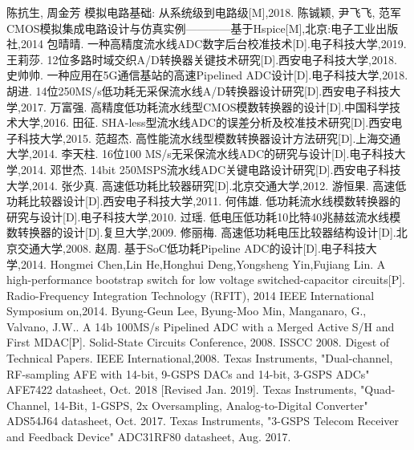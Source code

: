 \newpage

\begin{thebibliography}{99}
     陈抗生, 周金芳 模拟电路基础: 从系统级到电路级[M],2018.
      陈铖颖, 尹飞飞, 范军 CMOS模拟集成电路设计与仿真实例————基于Hspice[M],北京:电子工业出版社,2014
      包晴晴. 一种高精度流水线ADC数字后台校准技术[D].电子科技大学,2019.
      王莉莎. 12位多路时域交织A/D转换器关键技术研究[D].西安电子科技大学,2018.
      史帅帅. 一种应用在5G通信基站的高速Pipelined ADC设计[D].电子科技大学,2018.
      胡进. 14位250MS/s低功耗无采保流水线A/D转换器设计研究[D].西安电子科技大学,2017.
      万富强. 高精度低功耗流水线型CMOS模数转换器的设计[D].中国科学技术大学,2016.
      田征. SHA-less型流水线ADC的误差分析及校准技术研究[D].西安电子科技大学,2015.
      范超杰. 高性能流水线型模数转换器设计方法研究[D].上海交通大学,2014.
      李天柱. 16位100 MS/s无采保流水线ADC的研究与设计[D].电子科技大学,2014.
      邓世杰. 14bit 250MSPS流水线ADC关键电路设计研究[D].西安电子科技大学,2014.
      张少真. 高速低功耗比较器研究[D].北京交通大学,2012.
      游恒果. 高速低功耗比较器设计[D].西安电子科技大学,2011.
      何伟雄. 低功耗流水线模数转换器的研究与设计[D].电子科技大学,2010.
      过瑶. 低电压低功耗10比特40兆赫兹流水线模数转换器的设计[D].复旦大学,2009.
      修丽梅. 高速低功耗电压比较器结构设计[D].北京交通大学,2008.
      赵周. 基于SoC低功耗Pipeline ADC的设计[D].电子科技大学,2014.
      Hongmei Chen,Lin He,Honghui Deng,Yongsheng Yin,Fujiang Lin. A high-performance bootstrap switch for low voltage switched-capacitor circuits[P]. Radio-Frequency Integration Technology (RFIT), 2014 IEEE International Symposium on,2014.
      Byung-Geun Lee, Byung-Moo Min, Manganaro, G., Valvano, J.W.. A 14b 100MS/s Pipelined ADC with a Merged Active S/H and First MDAC[P]. Solid-State Circuits Conference, 2008. ISSCC 2008. Digest of Technical Papers. IEEE International,2008.
      Texas Instruments, "Dual-channel, RF-sampling AFE with 14-bit, 9-GSPS DACs and 14-bit, 3-GSPS ADCs" AFE7422 datasheet, Oct. 2018 [Revised Jan. 2019]. 
      Texas Instruments, "Quad-Channel, 14-Bit, 1-GSPS, 2x Oversampling, Analog-to-Digital Converter" ADS54J64 datasheet, Oct. 2017. 
      Texas Instruments, "3-GSPS Telecom Receiver and Feedback Device" ADC31RF80 datasheet, Aug. 2017. 

\end{thebibliography}
